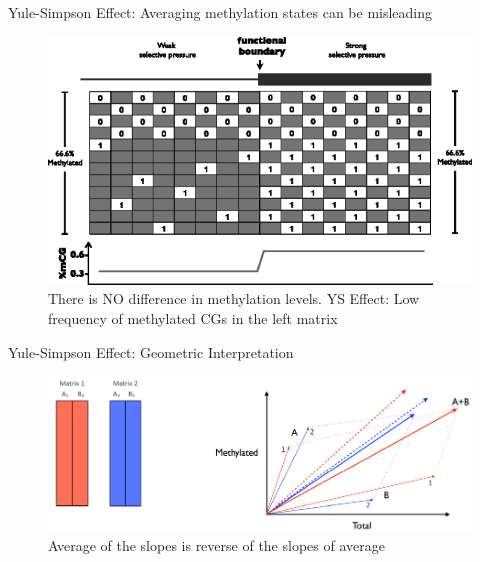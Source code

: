 \documentclass[10pt]{beamer}
\begin{document}
\begin{frame}[fragile]{Yule-Simpson Effect: Averaging methylation states can be misleading}
\begin{figure}
\includegraphics[width=\textwidth]{img/ys-boundary}
\caption{There is NO difference in methylation levels. YS Effect: Low frequency of methylated CGs in the left matrix}
\end{figure}
\end{frame}


\begin{frame}[fragile]{Yule-Simpson Effect: Geometric Interpretation}
\begin{figure}
\includegraphics[width=\textwidth]{img/geometric}
\caption{Average of the slopes is reverse of the slopes of average}
\end{figure}
\end{frame}
\end{document}
